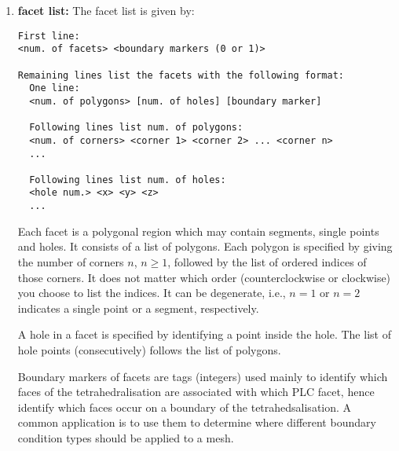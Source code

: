 \documentclass[12pt,twoside,a4paper]{article}
\numberwithin{equation}{section}
\newtheorem{remark}{Remark}[section]
\newcommand{\tetB}{\texttt{-B}}
\begin{document}
\begin{enumerate}
\begin{remark}[Boundary Markers]
  produced by TetGen by using the \tetB{} switch.  Mesh entities which are
  not on the boundary of the PLC must have the boundary markers ‘0’.  Mesh
  entities which are on the boundary will be assigned to a boundary marker
  that is the same as the boundary marker of that boundary of the PLC.
  However, if a boundary of a PLC does not have a boundary marker or have a
  marker ‘0’, TetGen will assign a ‘1’ to those entities belong to this
  boundary in the output files. This way, TetGen is able to distinguish them
  from other interior mesh entities.
\end{remark}


For \cref{fig:unitcube} we have:

                {\cubepolyfile}

\item \textbf{facet list:} The facet list is given by:
\begin{lstlisting}[style=raycodetetgenpoly,numbers=none]
First line: 
<num. of facets> <boundary markers (0 or 1)>

Remaining lines list the facets with the following format:
  One line: 
  <num. of polygons> [num. of holes] [boundary marker]

  Following lines list num. of polygons:
  <num. of corners> <corner 1> <corner 2> ... <corner n>
  ...
    
  Following lines list num. of holes:
  <hole num.> <x> <y> <z>
  ... 
\end{lstlisting} 

Each facet is a polygonal region which may contain segments, single points
and holes. It consists of a list of polygons. Each polygon is specified by
giving the number of corners $n$, $n \geq 1$, followed by the list of
ordered indices of those corners. It does not matter which order
(counterclockwise or clockwise) you choose to list the indices. It can be
degenerate, i.e., $n = 1$ or $n = 2$ indicates a single point or a segment,
respectively.  

A hole in a facet is specified by identifying a point inside the hole. The
list of hole points (consecutively) follows the list of polygons.  

Boundary markers of facets are tags (integers) used mainly to identify which
faces of the tetrahedralisation are associated with which PLC facet, hence
identify which faces occur on a boundary of the tetrahedsalisation. A common
application is to use them to determine where different boundary condition
types should be applied to a mesh.  


\end{enumerate}
\end{document}
